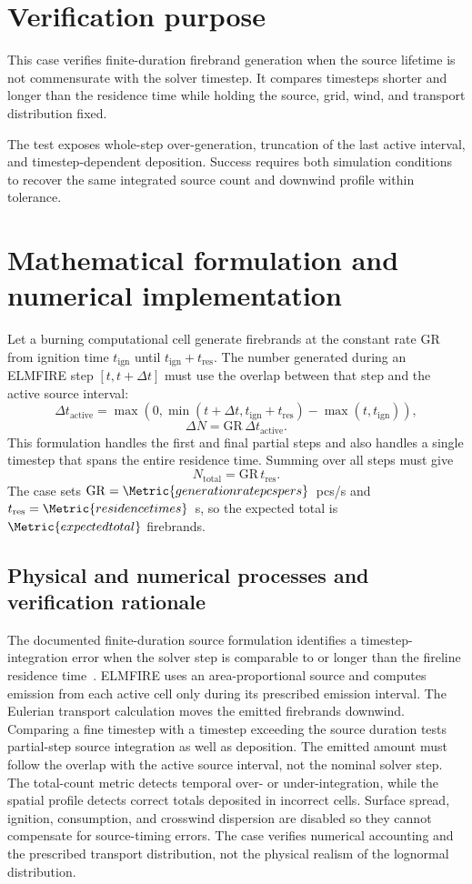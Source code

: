 \section{Verification purpose}

This case verifies finite-duration firebrand generation when the source lifetime is not commensurate with the solver timestep. It compares timesteps shorter and longer than the residence time while holding the source, grid, wind, and transport distribution fixed.

The test exposes whole-step over-generation, truncation of the last active interval, and timestep-dependent deposition. Success requires both simulation conditions to recover the same integrated source count and downwind profile within tolerance.

\section{Mathematical formulation and numerical implementation}
Let a burning computational cell generate firebrands at the constant rate
$\mathrm{GR}$ from ignition time $t_{\mathrm{ign}}$ until
$t_{\mathrm{ign}}+t_{\mathrm{res}}$. The number generated during an ELMFIRE
step $[t,t+\Delta t]$ must use the overlap between that step and the active
source interval:
\[
  \Delta t_{\mathrm{active}}
  =\max\!\left(0,
    \min(t+\Delta t,t_{\mathrm{ign}}+t_{\mathrm{res}})
    -\max(t,t_{\mathrm{ign}})\right),
\]
\[
  \Delta N=\mathrm{GR}\,\Delta t_{\mathrm{active}}.
\]
This formulation handles the first and final partial steps and also handles a
single timestep that spans the entire residence time. Summing over all steps
must give
\[
  N_{\mathrm{total}}=\mathrm{GR}\,t_{\mathrm{res}}.
\]
The case sets $\mathrm{GR}=\Metric{generationratepcspers}$~pcs/s and
$t_{\mathrm{res}}=\Metric{residencetimes}$~s, so the expected total is
$\Metric{expectedtotal}$ firebrands.

\subsection{Physical and numerical processes and verification rationale}

The documented finite-duration source formulation identifies a timestep-integration
error when the solver step is comparable to or longer than the fireline residence
time~\cite{Qin2025}.
ELMFIRE uses an area-proportional source and computes emission from each
active cell only during its prescribed emission interval. The Eulerian
transport calculation moves the emitted firebrands downwind. Comparing a
fine timestep with a timestep exceeding the source duration tests partial-step
source integration as well as deposition.
The emitted amount must follow the overlap with the active source interval,
not the nominal solver step. The total-count metric detects temporal over- or
under-integration, while the spatial profile detects correct totals deposited
in incorrect cells. Surface spread, ignition, consumption, and crosswind
dispersion are disabled so they cannot compensate for source-timing errors.
The case verifies numerical accounting and the prescribed transport
distribution, not the physical realism of the lognormal distribution.

